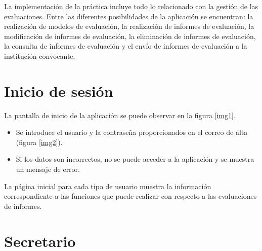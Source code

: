 \documentclass[12pt,a4paper,spanish,twoside]{book}
\begin{document}
La implementación de la práctica incluye todo lo relacionado con la gestión de
las e\-va\-lua\-cio\-nes. Entre las diferentes posibilidades de la aplicación se
encuentran: la realización de modelos de evaluación, la realización de informes
de evaluación, la modificación de informes de evaluación, la eliminación de 
informes de evaluación, la consulta de informes de evaluación y el envío de 
informes de evaluación a la institución convocante.

\section{Inicio de sesión}
La pantalla de inicio de la aplicación se puede observar en la figura
\ref{img1}.


\begin{itemize}
\item Se introduce el usuario y la contraseña proporcionados en el correo de 
alta (figura \ref{img2}).


\item Si los datos son incorrectos, no se puede acceder a la aplicación y se
  muestra un mensaje de error. 
\end{itemize}

La página inicial para cada tipo de usuario muestra la información 
correspondiente a las funciones que puede realizar con respecto a las 
evaluaciones de informes.


\section{Secretario}
\end{document}
